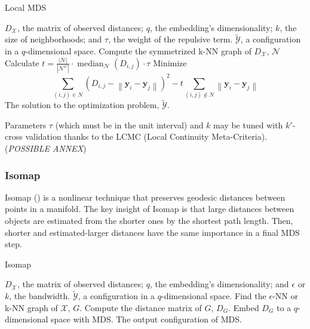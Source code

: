 \begin{algorithm}
    \caption{Local MDS}
    \label{alg:LocalMDS}
    
    \begin{algorithmic}[1]
    \REQUIRE $D_{\mathcal{X}}$, the matrix of observed distances; $q$, the embedding's dimensionality; $k$, the size of neighborhoods; and $\tau$, the weight of the repulsive term.
    \ENSURE $\tilde{\mathcal{Y}}$, a configuration in a $q$-dimensional space.
    \STATE Compute the symmetrized k-NN graph of $D_{\mathcal{X}}$, $\mathcal{N}$
    \STATE Calculate $t=\frac{|\mathcal{N}|}{\left|\mathcal{N}^C\right|} \cdot \operatorname{median}_{\mathcal{N}}\left(D_{i, j}\right) \cdot \tau$
    \STATE Minimize $$\sum_{(i, j) \in N}\left(D_{i, j}-\left\|\mathbf{y}_i-\mathbf{y}_j\right\|\right)^2 - t \sum_{(i, j) \notin N}\left\|\mathbf{y}_i-\mathbf{y}_j\right\|$$
    \RETURN The solution to the optimization problem, $\tilde{\mathcal{Y}}$.
    \end{algorithmic}
\end{algorithm}

Parameters $\tau$ (which must be in the unit interval) and $k$ may be tuned with $k'$-cross validation thanks to the LCMC (Local Continuity Meta-Criteria). (\textit{POSSIBLE ANNEX})

\subsubsection{Isomap}

Isomap (\cite{Tenenbaum2000}) is a nonlinear technique that preserves geodesic distances between points in a manifold. The key insight of Isomap is that large distances between objects are estimated from the shorter ones by the shortest path length. Then, shorter and estimated-larger distances have the same importance in a final MDS step.

\begin{algorithm}
    \caption{Isomap}
    \label{alg:Isomap}

    \begin{algorithmic}[1]
    \REQUIRE $D_{\mathcal{X}}$, the matrix of observed distances; $q$, the embedding's dimensionality; and $\epsilon$ or $k$, the bandwidth.
    \ENSURE $\tilde{\mathcal{Y}}$, a configuration in a $q$-dimensional space.
    \STATE Find the $\epsilon$-NN or k-NN graph of $\mathcal{X}$, $G$.
    \STATE Compute the distance matrix of $G$, $D_G$.
    \STATE Embed $D_G$ to a $q$-dimensional space with MDS.
    \RETURN The output configuration of MDS.
    
    \end{algorithmic}
\end{algorithm}

